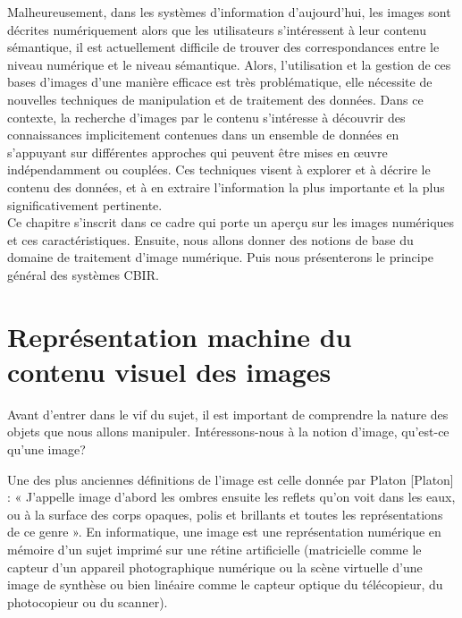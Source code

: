 Malheureusement, dans les systèmes d'information d'aujourd'hui, les images sont décrites numériquement alors que les utilisateurs s'intéressent à leur contenu sémantique, il est actuellement difficile de trouver des correspondances entre le niveau numérique et le niveau sémantique. Alors, l'utilisation et la gestion de ces bases d'images d'une manière efficace est très problématique, elle nécessite de nouvelles techniques de manipulation et de traitement des données. Dans ce contexte, la recherche d'images par le contenu s'intéresse à découvrir des connaissances implicitement contenues dans un ensemble de données en s'appuyant sur différentes approches qui peuvent être mises en œuvre indépendamment ou couplées. Ces techniques visent à explorer et à décrire le contenu des données, et à en extraire l'information la plus importante et la plus significativement pertinente.
%
\\

Ce chapitre s’inscrit dans ce cadre qui porte un aperçu sur les images numériques et ces caractéristiques. Ensuite, nous allons donner des notions de base du domaine de traitement d'image numérique. Puis nous présenterons le principe général des systèmes CBIR.



\section{Représentation machine du contenu visuel des images}

Avant d'entrer dans le vif du sujet, il est important de comprendre la nature des objets que nous allons manipuler. Intéressons-nous à la notion d'image, qu'est-ce qu'une image?

Une des plus anciennes définitions de l'image est celle donnée par Platon [Platon] : « J'appelle image d'abord les ombres ensuite les reflets qu'on voit dans les eaux, ou à la surface des corps opaques, polis et brillants et toutes les représentations de ce genre ». En informatique, une image est une représentation numérique en mémoire d’un sujet imprimé sur une rétine artificielle (matricielle comme le capteur d’un appareil photographique numérique ou la scène virtuelle d’une image de synthèse ou bien linéaire comme le capteur optique du télécopieur, du photocopieur ou du scanner). \\

